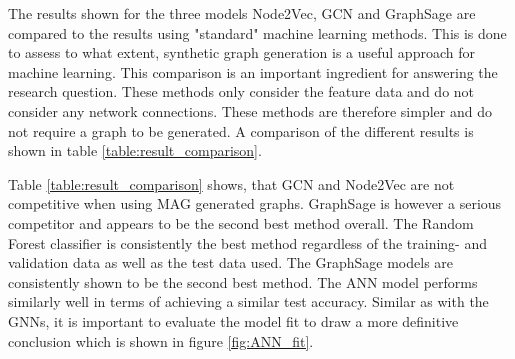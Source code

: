   The results shown for the three models Node2Vec, GCN and GraphSage are
  compared to the results using "standard" machine learning methods. This is
  done to assess to what extent, synthetic graph generation is a useful
  approach for machine learning. This comparison is an important ingredient for
  answering the research question. These methods only consider the
  feature data and do not consider any network connections. These methods are
  therefore simpler and do not require a graph to be generated. A comparison of
  the different results is shown in table \ref{table:result_comparison}.

  \begin{table}[h]
    \centering
    \caption{Result Comparison}
    \label{table:result_comparison}
  \end{table}

  \noindent Table \ref{table:result_comparison} shows, that GCN and Node2Vec
  are not competitive when using MAG generated graphs. GraphSage is however a 
  serious competitor and appears to be the second best method overall. The
  Random Forest classifier is consistently the best method regardless of the
  training- and validation data as well as the test data used. The GraphSage
  models are consistently shown to be the second best method. The ANN model
  performs similarly well in terms of achieving a similar test accuracy.
  Similar as with the GNNs, it is important to evaluate the model fit to draw a
  more definitive conclusion which is shown in figure \ref{fig:ANN_fit}.

